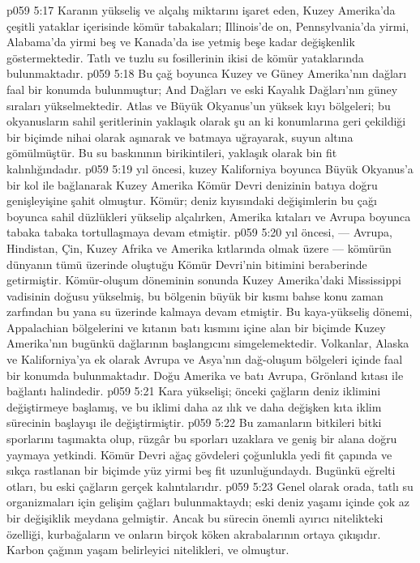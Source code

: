 \vs p059 5:17 Karanın yükseliş ve alçalış miktarını işaret eden, Kuzey Amerika’da çeşitli yataklar içerisinde kömür tabakaları; Illinois’de on, Pennsylvania’da yirmi, Alabama’da yirmi beş ve Kanada’da ise yetmiş beşe kadar değişkenlik göstermektedir. Tatlı ve tuzlu su fosillerinin ikisi de kömür yataklarında bulunmaktadır.
\vs p059 5:18 Bu çağ boyunca Kuzey ve Güney Amerika’nın dağları faal bir konumda bulunmuştur; And Dağları ve eski Kayalık Dağları’nın güney sıraları yükselmektedir. Atlas ve Büyük Okyanus’un yüksek kıyı bölgeleri; bu okyanusların sahil şeritlerinin yaklaşık olarak şu an ki konumlarına geri çekildiği bir biçimde nihai olarak aşınarak ve batmaya uğrayarak, suyun altına gömülmüştür. Bu su baskınının birikintileri, yaklaşık olarak bin fit kalınlığındadır.
\vs p059 5:19  yıl öncesi, kuzey Kaliforniya boyunca Büyük Okyanus’a bir kol ile bağlanarak Kuzey Amerika Kömür Devri denizinin batıya doğru genişleyişine şahit olmuştur. Kömür; deniz kıyısındaki değişimlerin bu çağı boyunca sahil düzlükleri yükselip alçalırken, Amerika kıtaları ve Avrupa boyunca tabaka tabaka tortullaşmaya devam etmiştir.
\vs p059 5:20  yıl öncesi, --- Avrupa, Hindistan, Çin, Kuzey Afrika ve Amerika kıtlarında olmak üzere --- kömürün dünyanın tümü üzerinde oluştuğu Kömür Devri’nin bitimini beraberinde getirmiştir. Kömür\hyp{}oluşum döneminin sonunda Kuzey Amerika’daki Mississippi vadisinin doğusu yükselmiş, bu bölgenin büyük bir kısmı bahse konu zaman zarfından bu yana su üzerinde kalmaya devam etmiştir. Bu kaya\hyp{}yükseliş dönemi, Appalachian bölgelerini ve kıtanın batı kısmını içine alan bir biçimde Kuzey Amerika’nın bugünkü dağlarının başlangıcını simgelemektedir. Volkanlar, Alaska ve Kaliforniya’ya ek olarak Avrupa ve Asya’nın dağ\hyp{}oluşum bölgeleri içinde faal bir konumda bulunmaktadır. Doğu Amerika ve batı Avrupa, Grönland kıtası ile bağlantı halindedir.
\vs p059 5:21 Kara yükselişi; önceki çağların deniz iklimini değiştirmeye başlamış, ve bu iklimi daha az ılık ve daha değişken kıta iklim sürecinin başlayışı ile değiştirmiştir.
\vs p059 5:22 Bu zamanların bitkileri bitki sporlarını taşımakta olup, rüzgâr bu sporları uzaklara ve geniş bir alana doğru yaymaya yetkindi. Kömür Devri ağaç gövdeleri çoğunlukla yedi fit çapında ve sıkça rastlanan bir biçimde yüz yirmi beş fit uzunluğundaydı. Bugünkü eğrelti otları, bu eski çağların gerçek kalıntılarıdır.
\vs p059 5:23 Genel olarak orada, tatlı su organizmaları için gelişim çağları bulunmaktaydı; eski deniz yaşamı içinde çok az bir değişiklik meydana gelmiştir. Ancak bu sürecin önemli ayırıcı nitelikteki özelliği, kurbağaların ve onların birçok köken akrabalarının  ortaya çıkışıdır. Karbon çağının yaşam belirleyici nitelikleri,  ve  olmuştur.
